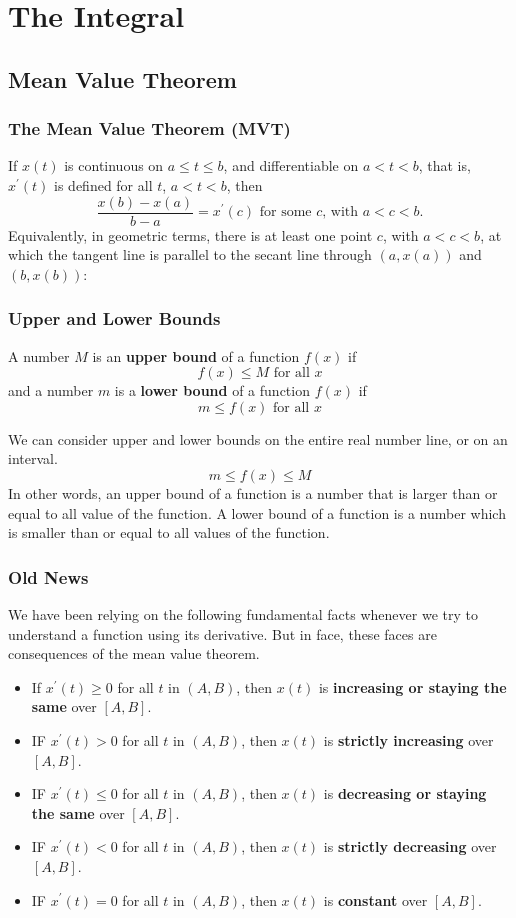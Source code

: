\chapter{The Integral}
\section{Mean Value Theorem}
\subsection{The Mean Value Theorem (MVT)}
If $x(t)$ is continuous on $a\le t\le b$, and differentiable on $a<t<b$, that is, $x^\prime(t)$ is defined for all $t$, $a<t<b$, then
\[
\frac{x(b)-x(a)}{b-a}=x^\prime(c)\text{ for some $c$, with $a<c<b$.}
\]
Equivalently, in geometric terms, there is at least one point $c$, with $a<c<b$, at which the tangent line is parallel to the secant line through $(a,x(a))$ and $(b,x(b))$:
\subsection{Upper and Lower Bounds}
A number $M$ is an \textbf{upper bound} of a function $f(x)$ if
\[f(x)\le M\text{ for all }x\]
and a number $m$ is a \textbf{lower bound} of a function $f(x)$ if
\[m\le f(x)\text{ for all }x\]

We can consider upper and lower bounds on the entire real number line, or on an interval.
\[m\le f(x)\le M\]
In other words, an upper bound of a function is a number that is larger than or equal to all value of the function. A lower bound of a function is a number which is smaller than or equal to all values of the function.
\subsection{Old News}
We have been relying on the following fundamental facts whenever we try to understand a function using its derivative. But in face, these faces are consequences of the mean value theorem.
\begin{itemize}
\item If $x^\prime(t)\ge0$ for all $t$ in $(A,B)$, then $x(t)$ is \textbf{increasing or staying the same} over $[A,B]$.
\item IF $x^\prime(t)>0$ for all $t$ in $(A,B)$, then $x(t)$ is \textbf{strictly increasing} over $[A,B]$.
\item IF $x^\prime(t)\le0$ for all $t$ in $(A,B)$, then $x(t)$ is \textbf{decreasing or staying the same} over $[A,B]$.
\item IF $x^\prime(t)<0$ for all $t$ in $(A,B)$, then $x(t)$ is \textbf{strictly decreasing} over $[A,B]$.
\item IF $x^\prime(t)=0$ for all $t$ in $(A,B)$, then $x(t)$ is \textbf{constant} over $[A,B]$.
\end{itemize}
